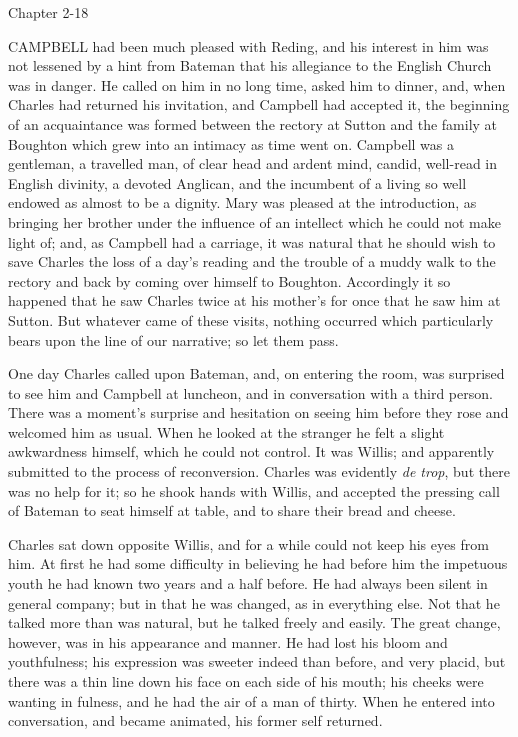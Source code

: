 Chapter 2-18


CAMPBELL had been much pleased with
Reding, and his interest in him was not lessened by a hint from
Bateman that his allegiance to the English Church was in danger. He
called on him in no long time, asked him to dinner, and, when Charles
had returned his invitation, and Campbell had accepted it, the
beginning of an acquaintance was formed between the rectory at Sutton
and the family at Boughton which grew into an intimacy as time went
on. Campbell was a gentleman, a travelled man, of clear head and
ardent mind, candid, well-read in English divinity, a devoted
Anglican, and the incumbent of a living so well endowed as almost to
be a dignity. Mary was pleased at the introduction, as bringing her
brother under the influence of an intellect which he could not make
light of; and, as Campbell had a carriage, it was natural that he
should wish to save Charles the loss of a day's reading and the
trouble of a muddy walk to the rectory and back by coming over himself
to Boughton. Accordingly it so happened that he saw Charles twice at
his mother's for once that he saw him at Sutton. But whatever came of
these visits, nothing occurred which particularly bears upon the
line of our narrative; so let them pass.

One day Charles called upon Bateman, and, on entering the room, was
surprised to see him and Campbell at luncheon, and in conversation
with a third person. There was a moment's surprise and hesitation on
seeing him before they rose and welcomed him as usual. When he looked
at the stranger he felt a slight awkwardness himself, which he could
not control. It was Willis; and apparently submitted to the process of
reconversion. Charles was evidently \emph{de trop}, but there was no
help for it; so he shook hands with Willis, and accepted the pressing
call of Bateman to seat himself at table, and to share their bread and
cheese.

Charles sat down opposite Willis, and for a while could not keep
his eyes from him. At first he had some difficulty in believing he had
before him the impetuous youth he had known two years and a half
before. He had always been silent in general company; but in that he
was changed, as in everything else. Not that he talked more than was
natural, but he talked freely and easily. The great change, however,
was in his appearance and manner. He had lost his bloom and
youthfulness; his expression was sweeter indeed than before, and very
placid, but there was a thin line down his face on each side of his
mouth; his cheeks were wanting in fulness, and he had the air of a man
of thirty. When he entered into conversation, and became animated, his
former self returned.

